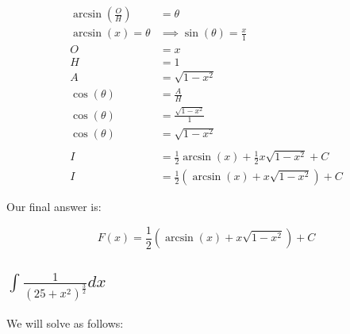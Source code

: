 \documentclass[12pt]{article}
\begin{document}
\begin{align}
    \arcsin\left(\frac{O}{H}\right) & = \theta                                                                           \\
    \arcsin(x) = \theta             & \implies \sin(\theta) = \frac{x}{1}                                                \\
    O                               & = x                                                                                \\
    H                               & = 1                                                                                \\
    A                               & = \sqrt{1-x^2}                                                                     \\
    \cos(\theta)                    & = \frac{A}{H}                                                                      \\
    \cos(\theta)                    & = \frac{\sqrt{1-x^2}}{1}                                                           \\
    \cos(\theta)                    & = \sqrt{1-x^2}                                                                     \\
    \nonumber                                                                                                            \\
    I                               & = \frac{1}{2} \arcsin(x) + \frac{1}{2} x\sqrt{1-x^2} + C                           \\
    I                               & = \frac{1}{2} \left(\arcsin(x) + x\sqrt{1-x^2}\right) + C
\end{align}


Our final answer is:

$$
    F(x) = \frac{1}{2} \left(\arcsin(x) + x\sqrt{1-x^2}\right) + C
$$

\subsection{$\int \frac{1}{(25+x^2)^{\frac{3}{2}}} dx$}

We will solve as follows:
\end{document}
